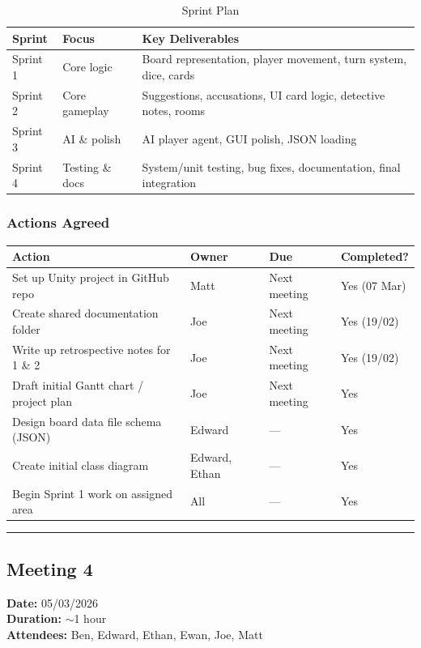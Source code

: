 \begin{table}[H]
\centering
\caption*{Sprint Plan}
\begin{tabular}{|l|l|p{8cm}|}
\hline
\textbf{Sprint} & \textbf{Focus} & \textbf{Key Deliverables} \\ \hline
Sprint 1 & Core logic & Board representation, player movement, turn system, dice, cards \\ \hline
Sprint 2 & Core gameplay & Suggestions, accusations, UI card logic, detective notes, rooms \\ \hline
Sprint 3 & AI \& polish & AI player agent, GUI polish, JSON loading \\ \hline
Sprint 4 & Testing \& docs & System/unit testing, bug fixes, documentation, final integration \\ \hline
\end{tabular}
\end{table}

\subsubsection*{Actions Agreed}
\begin{table}[H]
\centering
\begin{tabular}{|p{6cm}|l|l|l|}
\hline
\textbf{Action} & \textbf{Owner} & \textbf{Due} & \textbf{Completed?} \\ \hline
Set up Unity project in GitHub repo & Matt & Next meeting & Yes (07 Mar) \\ \hline
Create shared documentation folder & Joe & Next meeting & Yes (19/02) \\ \hline
Write up retrospective notes for 1 \& 2 & Joe & Next meeting & Yes (19/02) \\ \hline
Draft initial Gantt chart / project plan & Joe & Next meeting & Yes \\ \hline
Design board data file schema (JSON) & Edward & --- & Yes \\ \hline
Create initial class diagram & Edward, Ethan & --- & Yes \\ \hline
Begin Sprint 1 work on assigned area & All & --- & Yes \\ \hline
\end{tabular}
\end{table}

\smallskip
\hrule
\smallskip

\subsection{Meeting 4}
\textbf{Date:} 05/03/2026 \\
\textbf{Duration:} $\sim$1 hour \\
\textbf{Attendees:} Ben, Edward, Ethan, Ewan, Joe, Matt

